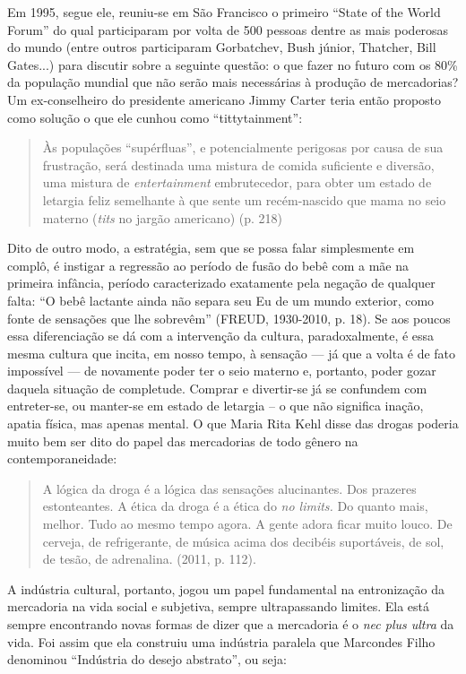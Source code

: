 Em 1995, segue ele, reuniu-se em São Francisco o primeiro ``State of the
World Forum'' do qual participaram por volta de 500 pessoas dentre as
mais poderosas do mundo (entre outros participaram Gorbatchev, Bush
júnior, Thatcher, Bill Gates...) para discutir sobre a seguinte questão:
o que fazer no futuro com os 80\% da população mundial que não serão
mais necessárias à produção de mercadorias? Um ex-conselheiro do
presidente americano Jimmy Carter teria então proposto como solução o
que ele cunhou como ``tittytainment'':

\begin{quote}
Às populações ``supérfluas'', e potencialmente perigosas por causa de
sua frustração, será destinada uma mistura de comida suficiente e
diversão, uma mistura de \emph{entertainment} embrutecedor, para obter
um estado de letargia feliz semelhante à que sente um recém-nascido que
mama no seio materno (\emph{tits} no jargão americano) (p. 218)
\end{quote}

Dito de outro modo, a estratégia, sem que se possa falar simplesmente em
complô, é instigar a regressão ao período de fusão do bebê com a mãe na
primeira infância, período caracterizado exatamente pela negação de
qualquer falta: ``O bebê lactante ainda não separa seu Eu de um mundo
exterior, como fonte de sensações que lhe sobrevêm'' (FREUD, 1930-2010,
p. 18). Se aos poucos essa diferenciação se dá com a intervenção da
cultura, paradoxalmente, é essa mesma cultura que incita, em nosso
tempo, à sensação --- já que a volta é de fato impossível --- de
novamente poder ter o seio materno e, portanto, poder gozar daquela
situação de completude. Comprar e divertir-se já se confundem com
entreter-se, ou manter-se em estado de letargia -- o que não significa
inação, apatia física, mas apenas mental. O que Maria Rita Kehl disse
das drogas poderia muito bem ser dito do papel das mercadorias de todo
gênero na contemporaneidade:

\begin{quote}
A lógica da droga é a lógica das sensações alucinantes. Dos prazeres
estonteantes. A ética da droga é a ética do \emph{no limits.} Do quanto
mais, melhor. Tudo ao mesmo tempo agora. A gente adora ficar muito
louco. De cerveja, de refrigerante, de música acima dos decibéis
suportáveis, de sol, de tesão, de adrenalina. (2011, p. 112).
\end{quote}

A indústria cultural, portanto, jogou um papel fundamental na
entronização da mercadoria na vida social e subjetiva, sempre
ultrapassando limites. Ela está sempre encontrando novas formas de dizer
que a mercadoria é o \emph{nec plus ultra} da vida. Foi assim que ela
construiu uma indústria paralela que Marcondes Filho denominou
``Indústria do desejo abstrato'', ou seja:

